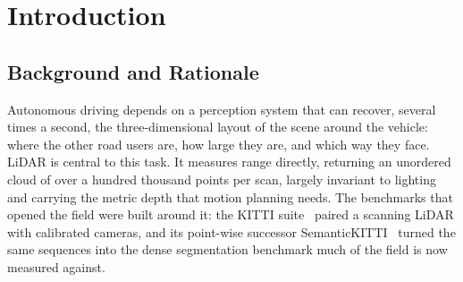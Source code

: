 %
%
%
\chapter{Introduction}
\label{ch:introduction}

\section{Background and Rationale}
\label{sec:intro-background}

Autonomous driving depends on a perception system that can recover, several times a
second, the three-dimensional layout of the scene around the vehicle: where the other
road users are, how large they are, and which way they face. LiDAR is central to this
task. It measures range directly, returning an unordered cloud of over a hundred
thousand points per scan, largely invariant to lighting and carrying the metric depth
that motion planning needs. The benchmarks that opened the field were built around it:
the KITTI suite~\cite{geiger2012we} paired a scanning LiDAR with calibrated cameras,
and its point-wise successor SemanticKITTI~\cite{Behley_2019_ICCV} turned the same
sequences into the dense segmentation benchmark much of the field is now measured
against.


